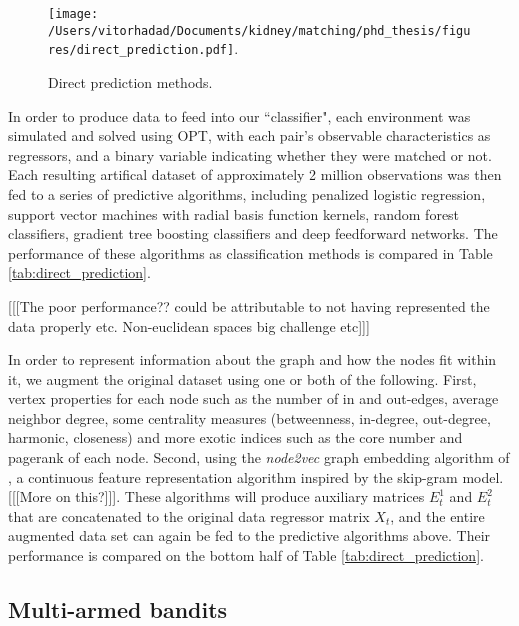\documentclass[12pt]{article}
\begin{document}
\begin{figure}
\centering
\hspace*{-1cm}
\texttt{[image: /Users/vitorhadad/Documents/kidney/matching/phd\_thesis/figures/direct\_prediction.pdf]}.
\caption{Direct prediction methods.}
\label{fig:direct_prediction}
\end{figure}

In order to produce data to feed into our ``classifier", each environment was simulated and solved using OPT, with each pair's observable characteristics as regressors, and a binary variable indicating whether they were matched or not. Each resulting artifical dataset of approximately 2 million observations was then fed to a series of predictive algorithms, including penalized logistic regression\cite{wu2009genome}, support vector machines with radial basis function kernels\cite{cortes1995support}, random forest classifiers\cite{breiman2001random}, gradient tree boosting classifiers\cite{friedman2001greedy} and deep feedforward networks\cite{goodfellow2016deep}. The performance of these algorithms as classification methods is compared in Table \ref{tab:direct_prediction}.

[[[The poor performance?? could be attributable to not having represented the data properly etc. Non-euclidean spaces big challenge etc]]]

 In order to represent information about the graph and how the nodes fit within it, we augment the original dataset using one or both of the following. First, vertex properties for each node such as the number of in and out-edges, average neighbor degree, some centrality measures (betweenness, in-degree, out-degree, harmonic, closeness) and more exotic indices such as the core number and pagerank of each node\cite{newman2010networks}. Second, using the \emph{node2vec} graph embedding algorithm of \cite{grover2016node2vec}, a continuous feature representation algorithm inspired by the skip-gram model.[[[More on this?]]]. These algorithms will produce auxiliary matrices $E_t^{1}$ and $E_t^2$ that are concatenated to the original data regressor matrix $X_t$, and the entire augmented data set can again be fed to the predictive algorithms above. Their performance is compared on the bottom half of Table \ref{tab:direct_prediction}.
 
 
 \subsection{Multi-armed bandits}
 
\end{document}
